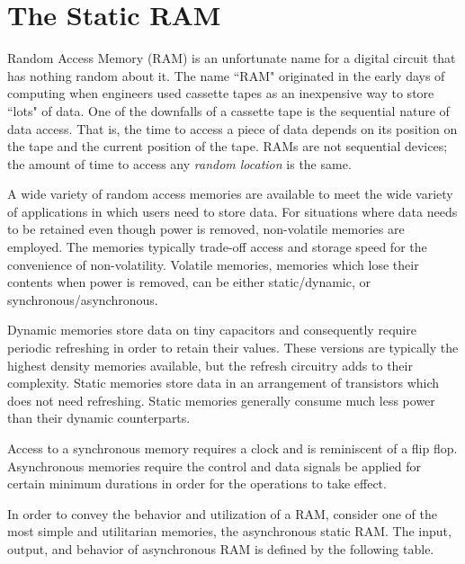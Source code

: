 \section{The Static RAM}
Random Access Memory (RAM) is an unfortunate name for a digital circuit 
that has nothing random about it.  The name ``RAM" originated in the early 
days of computing when engineers used cassette tapes as an inexpensive way 
to store ``lots" of data.  One of the downfalls of a cassette tape is the
sequential nature of data access.  That is, the time to access a piece of 
data depends on its position on the tape and the current position of the
tape.  RAMs are not sequential devices; the amount of time to access any
{\it random location} is the same.  

A wide variety of random access memories are available to meet the wide
variety of applications in which users need to store data.  For situations where
data needs to be retained even though power is removed, non-volatile memories are employed.  
The memories typically trade-off access and storage speed for the 
convenience of non-volatility.  Volatile memories, memories which lose
their contents when power is removed, can be either static/dynamic, or 
synchronous/asynchronous.  

Dynamic memories store data on tiny capacitors and
consequently require periodic refreshing in order to retain their values.  These versions
are typically the highest density memories available, but the refresh circuitry
adds to their complexity.  Static memories store data in an arrangement
of transistors which does not need refreshing.  Static memories generally 
consume much less power than their dynamic counterparts.  

Access to a synchronous memory requires a clock and is reminiscent of a flip flop.
Asynchronous memories require the control and data signals be applied
for certain minimum durations in order for the operations to take effect.

In order to convey the behavior and utilization of a RAM, consider one
of the most simple and utilitarian memories, the asynchronous static RAM.
The input, output, and behavior of asynchronous RAM is defined by the following table.


